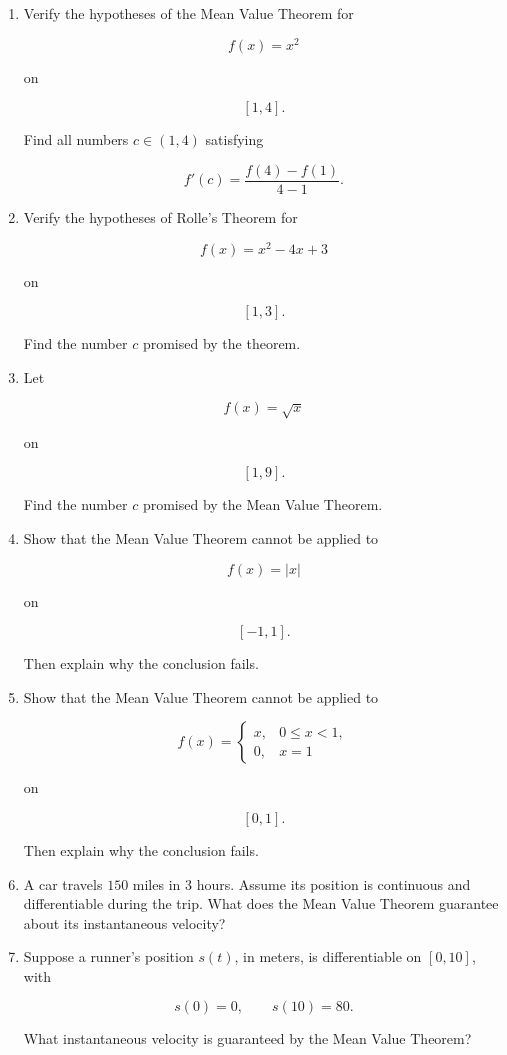 \begin{enumerate}
\item Verify the hypotheses of the Mean Value Theorem for

\[
f(x)=x^2
\]

on

\[
[1,4].
\]

Find all numbers \(c\in(1,4)\) satisfying

\[
f'(c)=\frac{f(4)-f(1)}{4-1}.
\]

\item Verify the hypotheses of Rolle's Theorem for

\[
f(x)=x^2-4x+3
\]

on

\[
[1,3].
\]

Find the number \(c\) promised by the theorem.

\item Let

\[
f(x)=\sqrt{x}
\]

on

\[
[1,9].
\]

Find the number \(c\) promised by the Mean Value Theorem.

\item Show that the Mean Value Theorem cannot be applied to

\[
f(x)=|x|
\]

on

\[
[-1,1].
\]

Then explain why the conclusion fails.

\item Show that the Mean Value Theorem cannot be applied to

\[
f(x)=
\begin{cases}
x, & 0\le x<1,\\
0, & x=1
\end{cases}
\]

on

\[
[0,1].
\]

Then explain why the conclusion fails.

\item A car travels \(150\) miles in \(3\) hours.  Assume its position is continuous and
differentiable during the trip.  What does the Mean Value Theorem guarantee about
its instantaneous velocity?

\item Suppose a runner's position \(s(t)\), in meters, is differentiable on \([0,10]\), with

\[
s(0)=0,
\qquad
s(10)=80.
\]

What instantaneous velocity is guaranteed by the Mean Value Theorem?
\end{enumerate}

